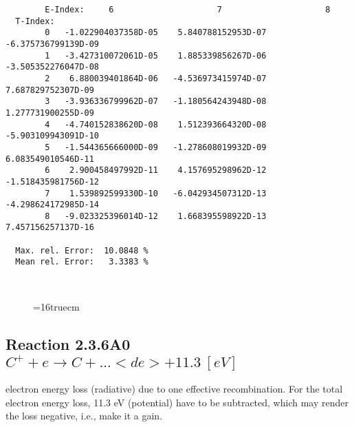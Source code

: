 \documentclass[12pt]{article}
\begin{document}
\begin{small}
\begin{verbatim}
        E-Index:     6                     7                     8
  T-Index:
        0   -1.022904037358D-05    5.840788152953D-07   -6.375736799139D-09
        1   -3.427310072061D-05    1.885339856267D-06   -3.505352276047D-08
        2    6.880039401864D-06   -4.536973415974D-07    7.687829752307D-09
        3   -3.936336799962D-07   -1.180564243948D-08    1.277731900255D-09
        4   -4.740152838620D-08    1.512393664320D-08   -5.903109943091D-10
        5   -1.544365666000D-09   -1.278608019932D-09    6.083549010546D-11
        6    2.900458497992D-11    4.157695298962D-12   -1.518435981756D-12
        7    1.539892599330D-10   -6.042934507312D-13   -4.298624172985D-14
        8   -9.023325396014D-12    1.668395598922D-13    7.457156257137D-16

  Max. rel. Error:  10.0848 %
  Mean rel. Error:   3.3383 %



\end{verbatim}\end{small}
\begin{figure} \label{2.3.6il1}
\epsfxsize=16truecm
\end{figure}
\newpage

\subsection{
  Reaction 2.3.6A0 $C^+ + e \rightarrow C     + ...   <de>+11.3 \ [eV] $
}

  electron energy loss (radiative) due to one effective recombination.
  For the total electron energy loss, 11.3 eV (potential) have to be
  subtracted, which may render the loss negative, i.e., make it a gain.
\end{document}
